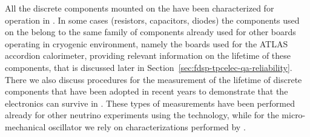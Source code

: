 All the discrete components mounted on the  have been
characterized for operation in . In some cases (resistors,
capacitors, diodes) the components used on the  
belong to the same family of components already used for other boards
operating in cryogenic environment, namely the boards used for the 
ATLAS accordion  calorimeter, providing relevant information
on the lifetime of these components, that is discussed later in 
Section~\ref{sec:fdsp-tpcelec-qa-reliability}. There we also discuss
procedures for the measurement of the lifetime of discrete
components that have been adopted in recent years to demonstrate
that the  electronics can survive in . 
These types of measurements have been performed already for 
other neutrino experiments using the  
technology, while for the micro-mechanical oscillator we 
rely on characterizations performed by .

